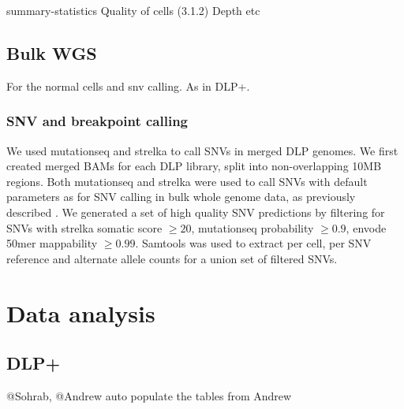 \documentclass{article}
\begin{document}
\begin{comment}

\end{comment}

summary-statistics
Quality of cells (3.1.2)
Depth
etc

\subsection{Bulk WGS}
For the normal cells and snv calling. 
As in DLP+.

\subsubsection*{SNV and breakpoint calling}

We used mutationseq \citep{Ding:2012nr} and strelka \citep{Saunders:2012fr} to call SNVs in merged DLP genomes.
We first created merged BAMs for each DLP library, split into non-overlapping 10MB regions.
Both mutationseq and strelka were used to call SNVs with default parameters as for SNV calling in bulk whole genome data, as previously described \citep{McPherson:2016ly}.
We generated a set of high quality SNV predictions by filtering for SNVs with strelka somatic score $\geq 20$, mutationseq probability $\geq 0.9$, envode 50mer mappability $\geq 0.99$.
Samtools was used to extract per cell, per SNV reference and alternate allele counts for a union set of filtered SNVs.

\begin{comment}
For breakpoint prediction we used deStruct \citep{McPherson117523}, which produced per cell per breakpoint counts.
Breakpoints were filtered for predictions with at least 5 split reads, and at least 250 nucleotides anchoring the predicted sequence on either side of the breakpoint ($\operatorname{template\_length\_min}$ feature).
\end{comment}



\section{Data analysis}
\subsection{DLP+}
@Sohrab, @Andrew 
auto populate the tables from Andrew
\end{document}
